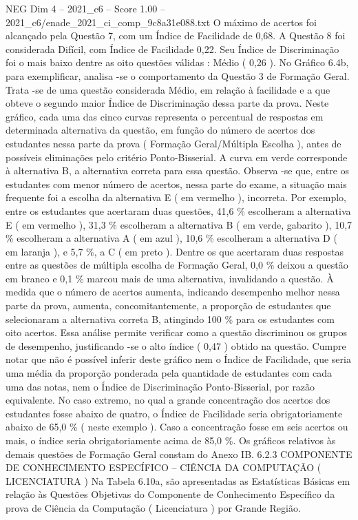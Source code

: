 \begin{textsample}{NEG Dim 4 – 2021\_c6 – Score 1.00 – 2021\_c6/enade\_2021\_ci\_comp\_9c8a31e088.txt}
O máximo de acertos foi alcançado pela Questão 7, com um Índice de Facilidade de 0,68.
A Questão 8 foi considerada Difícil, com Índice de Facilidade 0,22.
Seu Índice de Discriminação foi o mais baixo dentre as oito questões válidas : Médio ( 0,26 ).
No Gráfico 6.4b, para exemplificar, analisa -se o comportamento da Questão 3 de Formação Geral.
Trata -se de uma questão considerada Médio, em relação à facilidade e a que obteve o segundo maior Índice de Discriminação dessa parte da prova.
Neste gráfico, cada uma das cinco curvas representa o percentual de respostas em determinada alternativa da questão, em função do número de acertos dos estudantes nessa parte da prova ( Formação Geral/Múltipla Escolha ), antes de possíveis eliminações pelo critério Ponto-Bisserial.
A curva em verde corresponde à alternativa B, a alternativa correta para essa questão.
Observa -se que, entre os estudantes com menor número de acertos, nessa parte do exame, a situação mais frequente foi a escolha da alternativa E ( em vermelho ), incorreta.
Por exemplo, entre os estudantes que acertaram duas questões, 41,6 \% escolheram a alternativa E ( em vermelho ), 31,3 \% escolheram a alternativa B ( em verde, gabarito ), 10,7 \% escolheram a alternativa A ( em azul ), 10,6 \% escolheram a alternativa D ( em laranja ), e 5,7 \%, a C ( em preto ).
Dentre os que acertaram duas respostas entre as questões de múltipla escolha de Formação Geral, 0,0 \% deixou a questão em branco e 0,1 \% marcou mais de uma alternativa, invalidando a questão.
À medida que o número de acertos aumenta, indicando desempenho melhor nessa parte da prova, aumenta, concomitantemente, a proporção de estudantes que selecionaram a alternativa correta B, atingindo 100 \% para os estudantes com oito acertos.
Essa análise permite verificar como a questão discriminou os grupos de desempenho, justificando -se o alto índice ( 0,47 ) obtido na questão.
Cumpre notar que não é possível inferir deste gráfico nem o Índice de Facilidade, que seria uma média da proporção ponderada pela quantidade de estudantes com cada uma das notas, nem o Índice de Discriminação Ponto-Bisserial, por razão equivalente.
No caso extremo, no qual a grande concentração dos acertos dos estudantes fosse abaixo de quatro, o Índice de Facilidade seria obrigatoriamente abaixo de 65,0 \% ( neste exemplo ).
Caso a concentração fosse em seis acertos ou mais, o índice seria obrigatoriamente acima de 85,0 \%.
Os gráficos relativos às demais questões de Formação Geral constam do Anexo IB. 6.2.3 COMPONENTE DE CONHECIMENTO ESPECÍFICO – CIÊNCIA DA COMPUTAÇÃO ( LICENCIATURA ) Na Tabela 6.10a, são apresentadas as Estatísticas Básicas em relação às Questões Objetivas do Componente de Conhecimento Específico da prova de Ciência da Computação ( Licenciatura ) por Grande Região.

\end{textsample}
